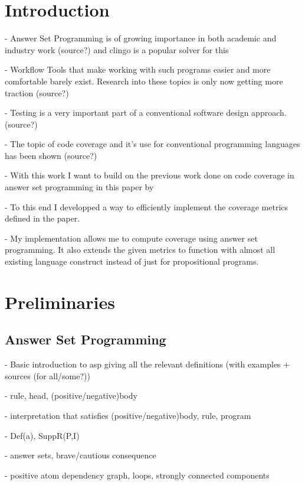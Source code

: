 \chapter{Introduction}
\label{ch:Introduction}
- Answer Set Programming is of growing importance in both academic and industry work (source?) and clingo is a popular solver for this

- Workflow Tools that make working with such programs easier and more comfortable barely exist. Research into these topics is only 
now getting more traction (source?)

- Testing is a very important part of a conventional software design approach.(source?)

- The topic of code coverage and it's use for conventional programming languages has been shown (source?)

- With this work I want to build on the previous work done on code coverage in answer set programming in this paper by \textcite{Jan+10}

- To this end I developped a way to efficiently implement the coverage metrics defined in the paper.

- My implementation allows me to compute coverage using answer set programming. It also extends the given metrics to function with
almost all existing language construct instead of just for propositional programs.


\chapter{Preliminaries}
\label{ch:Preliminaries}

\section{Answer Set Programming}
\label{sec:Preliminaries/Answer Set Programming}
- Basic introduction to asp giving all the relevant definitions (with examples + sources (for all/some?)) 
    
    - rule, head, (positive/negative)body
    
    - interpretation that satisfies (positive/negative)body, rule, program

    - Def(a), SuppR(P,I)

    - answer sets, brave/cautious consequence

    - positive atom dependency graph, loops, strongly connected components

